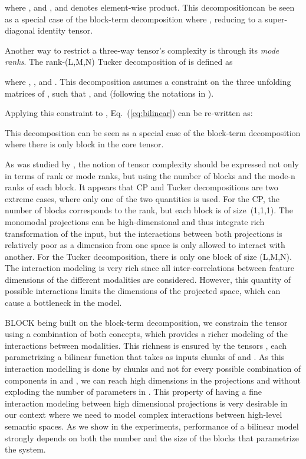 \documentclass[letterpaper]{article} \usepackage{aaai19}  \usepackage{times}  \usepackage{helvet}  \usepackage{courier}  \usepackage{url}  \usepackage{graphicx}  \usepackage{booktabs}       \usepackage{comment}
\begin{document}
where ,  and , and  denotes element-wise product. This decompositioncan be seen as a special case of the block-term decomposition where , reducing  to a super-diagonal identity tensor.

Another way to restrict a three-way tensor's complexity is through its \textit{mode ranks}. The rank-(L,M,N) Tucker decomposition \cite{Tucker1966} of  is defined as

where , ,  and . This decomposition assumes a constraint on the three unfolding matrices of , such that ,  and  (following the notations in \cite{De08f}).

Applying this constraint to , Eq.~(\ref{eq:bilinear}) can be re-written as:

This decomposition can be seen as a special case of the block-term decomposition where there is only  block in the core tensor.
    
As was studied by \cite{De08f}, the notion of tensor complexity should be expressed not only in terms of rank or mode ranks, but using the number of blocks and the mode-n ranks of each block. It appears that CP and Tucker decompositions are two extreme cases, where only one of the two quantities is used. For the CP, the number of blocks corresponds to the rank, but each block is of size~(1,1,1). 
The monomodal projections can be high-dimensional and thus integrate rich transformation of the input, but the interactions between both projections is relatively poor as a dimension from one space is only allowed to interact with another. For the Tucker decomposition, there is only one block of size (L,M,N). The interaction modeling is very rich since all inter-correlations between feature dimensions of the different modalities are considered. However, this quantity of possible interactions limits the dimensions of the projected space, which can cause a bottleneck in the model.

BLOCK being built on the block-term decomposition, we constrain the tensor using a combination of both concepts, which provides a richer modeling of the interactions between modalities. This richness is ensured by the  tensors , each parametrizing a bilinear function that takes as inputs chunks of  and . As this interaction modelling is done by chunks and not for every possible combination of components in  and , we can reach high dimensions in the projections  and  without exploding the number of parameters in . 
This property of having a fine interaction modeling between high dimensional projections is very desirable in our context where we need to model complex interactions between high-level semantic spaces. As we show in the experiments, performance of a bilinear model strongly depends on both the number and the size of the blocks  that parametrize the system.
\end{document}

